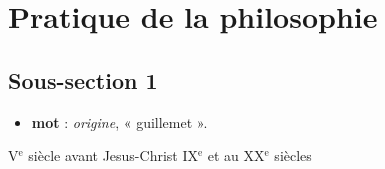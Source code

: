 
\section{Pratique de la philosophie}

\subsection{Sous-section 1} \label{labelLivre1}

\begin{itemize}[leftmargin=1cm, label=, itemsep=1pt]
\item {\footnotesize \bf mot} : {\it origine}, « guillemet ».
\end{itemize}

{\footnotesize V}$^\text{e}$ siècle avant Jesus-Christ
{\footnotesize IX}$^\text{e}$  et au {\footnotesize XX}$^\text{e}$ siècles


